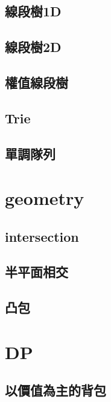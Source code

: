     \subsection{線段樹1D}
        
    \subsection{線段樹2D}
        
    \subsection{權值線段樹}
        
    \subsection{Trie}
        
    \subsection{單調隊列}
        
        
\section{geometry}
    \subsection{intersection}
        
    \subsection{半平面相交}
        
    \subsection{凸包}
        

\section{DP}
    \subsection{以價值為主的背包}
        
